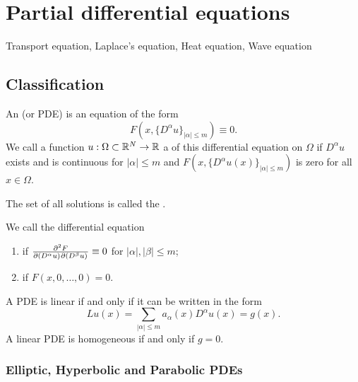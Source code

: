 \chapter{Partial differential equations}
Transport equation, Laplace's equation, Heat equation, Wave equation
\section{Classification}
\begin{definition}
An  (or PDE) is an equation of the form
\[ F(x, \{D^\alpha u\}_{|\alpha|\leq m}) \equiv 0. \]
We call a  function $u: \Omega \subset \mathbb{R}^N \to \mathbb{R}$ a  of this differential equation on $\Omega$ if $D^\alpha u$ exists and is continuous for $|\alpha|\leq m$ and $F(x, \{D^\alpha u(x)\}_{|\alpha|\leq m})$ is zero for all $x\in \Omega$.

The set of all solutions is called the .

We call the differential equation
\begin{enumerate}
\item {} if $\md{F}{2}{(D^\alpha u)}{}{(D^\beta u)}{} \equiv 0$ for $|\alpha|,|\beta|\leq m$;
\item {} if $F(x, 0,\ldots, 0) = 0$.
\end{enumerate}
\end{definition}

\begin{lemma}
A PDE is linear \textup{if and only if} it can be written in the form
\[ Lu(x) = \sum_{|\alpha|\leq m}a_\alpha(x)D^\alpha u(x) = g(x). \]
A linear PDE is homogeneous \textup{if and only if} $g = 0$.
\end{lemma}

\subsection{Elliptic, Hyperbolic and Parabolic PDEs}